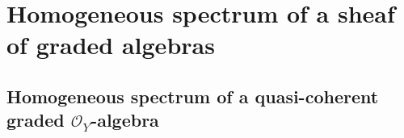 \section{Homogeneous spectrum of a sheaf of graded algebras}
\label{section:2.3}


\subsection{Homogeneous spectrum of a quasi-coherent graded $\mathcal{O}_Y$-algebra}
\label{subsection:2.3.1}















